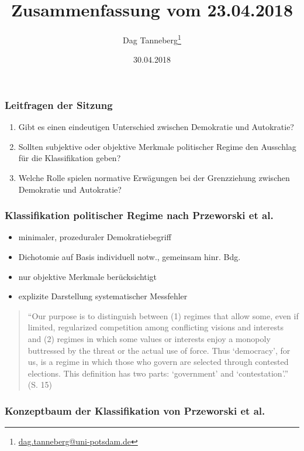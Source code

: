 \documentclass{beamer}
\title{Zusammenfassung vom 23.04.2018}
\author{Dag Tanneberg\thanks{%
  \href{mailto:dag.tanneberg@uni-potsdam.de}%
    {dag.tanneberg@uni-potsdam.de}
  }
}
\institute[Universität Potsdam]{
  {\glqq}Wie erkl\"art man autorit\"are Herrschaft?{\grqq}\\
  Universität Potsdam\\
  Lehrstuhl für Vergleichende Politikwissenschaft\\
  Sommersemester 2018
}
\date{30.04.2018}
\begin{document}
\maketitle

\begin{frame}
  \frametitle{Leitfragen der Sitzung}
  \begin{enumerate}
    \item Gibt es einen eindeutigen Unterschied zwischen
      Demokratie und Autokratie?
    \item Sollten subjektive oder objektive Merkmale
      politischer Regime den Ausschlag für die Klassifikation
      geben?
    \item Welche Rolle spielen normative Erwägungen bei der
      Grenzziehung zwischen Demokratie und Autokratie?
  \end{enumerate}
\end{frame}

\begin{frame}
  \frametitle{Klassifikation politischer Regime nach Przeworski et al.}
  \begin{itemize}
    \item minimaler, prozeduraler Demokratiebegriff
    \item Dichotomie auf Basis individuell notw., gemeinsam hinr. Bdg.
    \item nur objektive Merkmale berücksichtigt
    \item explizite Darstellung systematischer Messfehler
  \end{itemize}

  \begin{quote}
    \normalfont
    \small
    ``Our purpose is to distinguish between (1) regimes that
    allow some, even if limited, regularized competition
    among conflicting visions and interests and (2) regimes
    in which some values or interests enjoy a monopoly
    buttressed by the threat or the actual use of force.
    Thus `democracy', for us, is a regime in which those who
    govern are selected through contested elections. This
    definition has two parts: `government' and
    `contestation'.'' (S. 15)
  \end{quote}
\end{frame}

\begin{frame}
  \frametitle{Konzeptbaum der Klassifikation von Przeworski et al.}
  \begin{figure}[t]
    
  \end{figure}
\end{frame}
\end{document}
